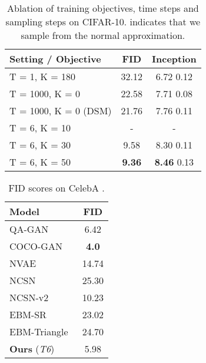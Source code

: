 \documentclass{article} \usepackage{iclr2021_conference,times}
\begin{document}
\begin{center}
\begin{minipage}[c]{.44\textwidth}
\begin{table}[H]
\centering
	\caption{Ablation of training objectives, time steps  and sampling steps  on CIFAR-10.  indicates that we sample from the normal approximation.}  
\footnotesize
	 \setlength\tabcolsep{4 pt}
 \begin{tabular}{lcc} 
    \toprule
    Setting / Objective & FID & Inception \\
    \midrule
    T = 1, K = 180 & 32.12 & 6.72  0.12 \\
    T = 1000, K = 0 & 22.58 & 7.71  0.08 \\
    T = 1000, K = 0 (DSM) & 21.76 & 7.76  0.11 \\
    T = 6, K = 10 & - & - \\
    T = 6, K = 30 & 9.58 & 8.30  0.11 \\
    T = 6, K = 50 & {\bf 9.36} & {\bf 8.46}  0.13 \\
        \bottomrule 
    \end{tabular}
    \label{tabl: ablation}
\end{table}
\vspace{-4mm}
\begin{table}[H]
\centering
	\caption{FID scores on CelebA .} 
	\vspace{-0.2cm}
	\footnotesize
	 \setlength\tabcolsep{1.5pt}
	 \begin{adjustbox}{max width=\textwidth}
     \begin{tabular}{lc} 
        \toprule
        Model & FID \\
        \midrule
        QA-GAN~\citep{parimala2019quality} & 6.42 \\
        COCO-GAN~\citep{lin2019coco} & {\bf 4.0} \\
        \midrule
        NVAE~\citep{vahdat2020nvae} & 14.74 \\
        \midrule
        NCSN~\citep{song2019generative} & 25.30 \\
        NCSN-v2~\citep{song2020improved} & 10.23 \\
        \midrule
        EBM-SR~\citep{nijkamp2019learning} & 23.02\\
        EBM-Triangle~\citep{han2020joint} & 24.70 \\
        {\bf Ours} ({\em T6}) & 5.98 \\
            \bottomrule 
    \end{tabular}
    \end{adjustbox}
    \label{tabl: fid-celeba}
\end{table}
\end{minipage}
\end{center}
\end{document}
